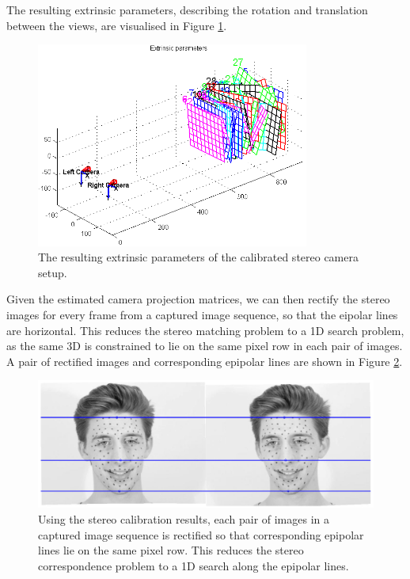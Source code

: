 \documentclass[11pt]{report}
\begin{document}
The resulting extrinsic parameters, describing the rotation and translation between the views, are visualised in Figure \ref{fig:calib}.

\begin{figure}[htbp!]
\centering
\includegraphics[width=0.8\textwidth]{img/calib}
	\caption{The resulting extrinsic parameters of the calibrated stereo camera setup.}
	\label{fig:calib}
\end{figure}

Given the estimated camera projection matrices, we can then rectify the stereo images for every frame from a captured image sequence, so that the eipolar lines are horizontal. This reduces the stereo matching problem to a 1D search problem, as the same 3D is constrained to lie on the same pixel row in each pair of images. A pair of rectified images and corresponding epipolar lines are shown in Figure \ref{fig:epipolarlines}.

\begin{figure}[htbp!]
\centering
\includegraphics[width=\textwidth]{img/epipolarlines}
	\caption{Using the stereo calibration results, each pair of images in a captured image sequence is rectified so that corresponding epipolar lines lie on the same pixel row. This reduces the stereo correspondence problem to a 1D search along the epipolar lines.}
	\label{fig:epipolarlines}
\end{figure}
\end{document}
